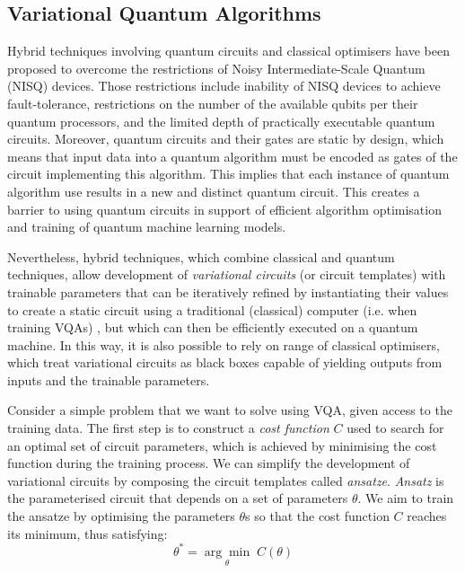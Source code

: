 \subsection{Variational Quantum Algorithms}\label{Sec: Variational Quantum Algorithms}

Hybrid techniques involving quantum circuits and classical optimisers have been proposed to overcome the restrictions of Noisy Intermediate-Scale Quantum (NISQ) \cite{brooksQuantumSupremacyHunt2019} devices.
Those restrictions include inability of NISQ devices to achieve fault-tolerance, restrictions on the number of the available qubits per their quantum processors, and the limited depth of practically executable quantum circuits.
Moreover, quantum circuits and their gates are static by design, which means that input data into a quantum algorithm must be encoded as gates of the circuit implementing this algorithm. This implies that each instance of quantum algorithm use results in a new and distinct quantum circuit. This creates a barrier to using quantum circuits in support of efficient algorithm optimisation and training of quantum machine learning models.

Nevertheless, hybrid techniques, which combine classical and quantum techniques, allow development of \emph{variational circuits} (or circuit templates) with trainable parameters that can be iteratively refined by instantiating their values to create a static circuit using a traditional (classical) computer (i.e. when training VQAs) \cite{cerezo2021variational}, but which can then be efficiently executed on a quantum machine.
In this way, it is also possible to rely on range of classical optimisers, which treat variational circuits as black boxes capable of yielding outputs from inputs and the trainable parameters.

Consider a simple problem that we want to solve using VQA, given access to the training data.
The first step is to construct a \textit{cost function} $C$ used to search for an optimal set of circuit parameters, which is achieved by minimising the cost function during the training process.
We can simplify the development of variational circuits by composing the circuit templates called \textit{ansatze}.
\textit{Ansatz} is the parameterised circuit that depends on a set of parameters $\theta$. We aim to train the ansatze by optimising the parameters $\theta$s so that the cost function $C$ reaches its minimum, thus satisfying:
\begin{equation}
    \theta^* = \underset{\theta}{\arg \min} \;C(\theta)
    \label{Eqn: optimize theta with ansatz}
\end{equation}

